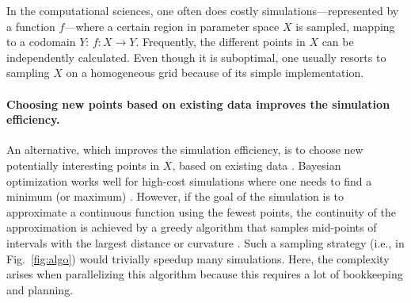\documentclass[english, twocolumn, 10pt, aps, superscriptaddress, floatfix, prb, citeautoscript]{revtex4-1}
\renewcommand{\citep}{\cite}
\begin{document}
In the computational sciences, one often does costly simulations---represented by a function \(f\)---where a certain region in parameter space \(X\) is sampled, mapping to a codomain \(Y\): \(f \colon X \to Y\).
Frequently, the different points in \(X\) can be independently calculated.
Even though it is suboptimal, one usually resorts to sampling \(X\) on a homogeneous grid because of its simple implementation.

\hypertarget{choosing-new-points-based-on-existing-data-improves-the-simulation-efficiency.}{%
\paragraph{Choosing new points based on existing data improves the simulation efficiency.}\label{choosing-new-points-based-on-existing-data-improves-the-simulation-efficiency.}}

An alternative, which improves the simulation efficiency, is to choose new potentially interesting points in \(X\), based on existing data \citep{Gramacy2004, Figueiredo1995, Castro2008, Chen2017}.
Bayesian optimization works well for high-cost simulations where one needs to find a minimum (or maximum) \citep{Takhtaganov2018}.
However, if the goal of the simulation is to approximate a continuous function using the fewest points, the continuity of the approximation is achieved by a greedy algorithm that samples mid-points of intervals with the largest distance or curvature \citep{Wolfram2011}.
Such a sampling strategy (i.e., in Fig.~\ref{fig:algo}) would trivially speedup many simulations.
Here, the complexity arises when parallelizing this algorithm because this requires a lot of bookkeeping and planning.
\end{document}
